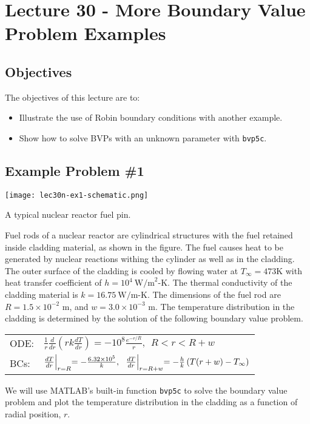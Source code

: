 \chapter{Lecture 30 - More Boundary Value Problem Examples}
\label{ch:lec30n}
\section{Objectives}
The objectives of this lecture are to:
\begin{itemize}
\item Illustrate the use of Robin boundary conditions with another example.
\item Show how to solve BVPs with an unknown parameter with \lstinline[style=myMatlab]{bvp5c}.
\end{itemize}
\setcounter{lstannotation}{0}

\section{Example Problem \#1}
\begin{marginfigure}
\texttt{[image: lec30n-ex1-schematic.png]}
\caption{A typical nuclear reactor fuel pin.}
\label{fig:lec30n-ex1-schematic}
\end{marginfigure}
Fuel rods of a nuclear reactor are cylindrical structures with the fuel retained inside cladding material, as shown in the figure.  The fuel causes heat to be generated by nuclear reactions withing the cylinder as well as in the cladding. The outer surface of the cladding is cooled by flowing water at $T_{\infty}=473$K with heat transfer coefficient of $h=10^4\ \text{W/m}^2\text{-K}$.  The thermal conductivity of the cladding material is $k=16.75 \ \text{W/m-K}$.  The dimensions of the fuel rod are $R=1.5\times 10^{-2}\text{ m}$, and $w=3.0\times 10^{-3}\text{ m}$. The temperature distribution in the cladding is determined by the solution of the following boundary value problem.  
\begin{table}
\begin{tabular}{l l}
ODE: & $\frac{1}{r}\frac{d}{dr}\left(rk\frac{dT}{dr}\right)=-10^8\frac{e^{-r/R}}{r}, \ \  R < r < R+w $ \\
BCs: & $\frac{dT}{dr}\Bigl|_{r=R}=-\frac{6.32\times 10^5}{k}, \ \ \frac{dT}{dr}\Bigl|_{r=R+w}=-\frac{h}{k}\left(T(r+w)-T_{\infty}\right)$ \\
\end{tabular}
\end{table}
We will use MATLAB's built-in function \lstinline[style=myMatlab]{bvp5c} to solve the boundary value problem and plot the temperature distribution in the cladding as a function of radial position, $r$.

